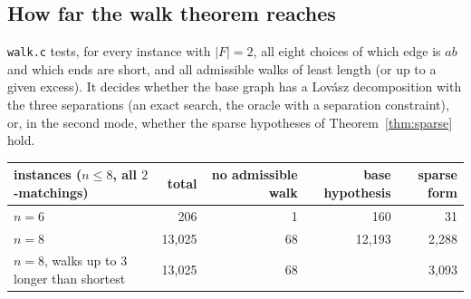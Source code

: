 \documentclass[11pt]{amsart}
\theoremstyle{definition}
\begin{document}
\subsection*{How far the walk theorem reaches}
\texttt{walk.c} tests, for every instance with $|F|=2$, all eight choices of which edge is $ab$
and which ends are short, and all admissible walks of least length (or up to a given excess). It
decides whether the base graph has a Lov\'asz decomposition with the three separations (an exact
search, the oracle with a separation constraint), or, in the second mode, whether the sparse
hypotheses of Theorem~\ref{thm:sparse} hold.

\begin{center}\footnotesize
\begin{tabular}{@{}lrrrr@{}}
\toprule
instances ($n\le8$, all $2$-matchings) & total & no admissible walk & base hypothesis & sparse form\\
\midrule
$n=6$ & 206 & 1 & 160 & 31\\
$n=8$ & 13{,}025 & 68 & 12{,}193 & 2{,}288 \\
$n=8$, walks up to $3$ longer than shortest & 13{,}025 & 68 & & 3{,}093\\
\bottomrule
\end{tabular}
\end{center}
\end{document}
